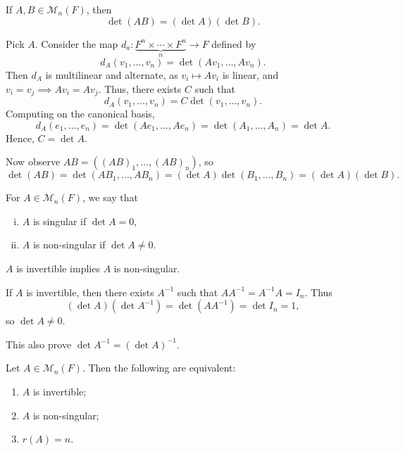 \documentclass[12pt]{article}
\begin{document}
\begin{lemma}
	If $A, B \in \mathcal{M}_{n}(F)$, then 
	\[
		\det (AB) = (\det A)(\det B)
	.\]
\end{lemma}

\begin{proofbox}
	Pick $A$. Consider the map $d_a : \underbrace{F^{n} \times \cdots \times F^{n}}_{n} \to F$ defined by
	\[
		d_A(v_1, \ldots, v_n) = \det(Av_1, \ldots, Av_n)
	.\]
	Then $d_A$ is multilinear and alternate, as $v_i \mapsto A v_i$ is linear, and $v_i = v_j \implies A v_i = A v_j$. Thus, there exists $C$ such that
	\[
		d_A(v_1, \ldots, v_n) = C \det(v_1, \ldots, v_n)
	.\]
	Computing on the canonical basis,
	\[
		d_A(e_1, \ldots, e_n) = \det(Ae_1, \ldots, Ae_n) = \det(A_1, \ldots, A_n) = \det A
	.\]
	Hence, $C = \det A$.

	Now observe $AB = ((AB)_1, \ldots, (AB)_n)$, so
	\[
		\det(AB) = \det(AB_1, \ldots, AB_n) = (\det A)\det(B_1, \ldots, B_n) = (\det A)(\det B)
	.\]
\end{proofbox}

\begin{definition}
	For $A \in \mathcal{M}_n(F)$, we say that
	\begin{enumerate}[(i)]
		\item $A$ is singular if $\det A = 0$,
		\item $A$ is non-singular if $\det A \neq 0$.
	\end{enumerate}
\end{definition}

\begin{lemma}
	$A$ is invertible implies $A$ is non-singular.
\end{lemma}

\begin{proofbox}
	If $A$ is invertible, then there exists $A^{-1}$ such that $AA^{-1} = A^{-1}A = I_n$. Thus
	\[
		(\det A)(\det A^{-1}) = \det (AA^{-1}) = \det I_n = 1
	,\]
	so $\det A \neq 0$.
\end{proofbox}

\begin{remark}
	This also prove $\det A^{-1} = (\det A)^{-1}$.
\end{remark}

\begin{theorem}
	Let $A \in \mathcal{M}_n(F)$. Then the following are equivalent:
	\begin{enumerate}[\normalfont(i)]
		\item $A$ is invertible;
		\item $A$ is non-singular;
		\item $r(A) = n$.
	\end{enumerate}
\end{theorem}
\end{document}
